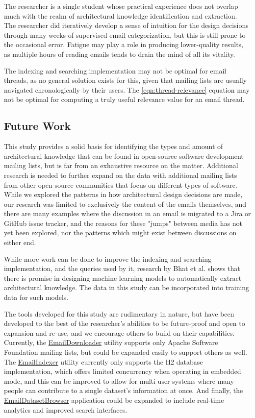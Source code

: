 \documentclass[a4paper, 12pt]{article}
\begin{document}
		The researcher is a single student whose practical experience does not overlap much with the realm of architectural knowledge identification and extraction. The researcher did iteratively develop a sense of intuition for the design decisions through many weeks of supervised email categorization, but this is still prone to the occasional error. Fatigue may play a role in producing lower-quality results, as multiple hours of reading emails tends to drain the mind of all its vitality.
		
		The indexing and searching implementation may not be optimal for email threads, as no general solution exists for this, given that mailing lists are usually navigated chronologically by their users. The \ref{eqn:thread-relevance} equation may not be optimal for computing a truly useful relevance value for an email thread.
		
	\subsection{Future Work}
		This study provides a solid basis for identifying the types and amount of architectural knowledge that can be found in open-source software development mailing lists, but is far from an exhaustive resource on the matter. Additional research is needed to further expand on the data with additional mailing lists from other open-source communities that focus on different types of software. While we explored the patterns in how architectural design decisions are made, our research was limited to exclusively the content of the emails themselves, and there are many examples where the discussion in an email is migrated to a Jira or GitHub issue tracker, and the reasons for these "jumps" between media has not yet been explored, nor the patterns which might exist between discussions on either end.
		
		While more work can be done to improve the indexing and searching implementation, and the queries used by it, research by Bhat et al.\cite{bhat} shows that there is promise in designing machine learning models to automatically extract architectural knowledge. The data in this study can be incorporated into training data for such models.
		
		The tools developed for this study are rudimentary in nature, but have been developed to the best of the researcher's abilities to be future-proof and open to expansion and re-use, and we encourage others to build on their capabilities. Currently, the \href{https://github.com/ArchitecturalKnowledgeAnalysis/EmailDownloader}{EmailDownloader} utility supports only Apache Software Foundation mailing lists, but could be expanded easily to support others as well. The \href{https://github.com/ArchitecturalKnowledgeAnalysis/EmailIndexer}{EmailIndexer} utility currently only supports the H2 database implementation, which offers limited concurrency when operating in embedded mode, and this can be improved to allow for multi-user systems where many people can contribute to a single dataset's information at once. And finally, the \href{https://github.com/ArchitecturalKnowledgeAnalysis/EmailDatasetBrowser}{EmailDatasetBrowser} application could be expanded to include real-time analytics and improved search interfaces.
\end{document}
